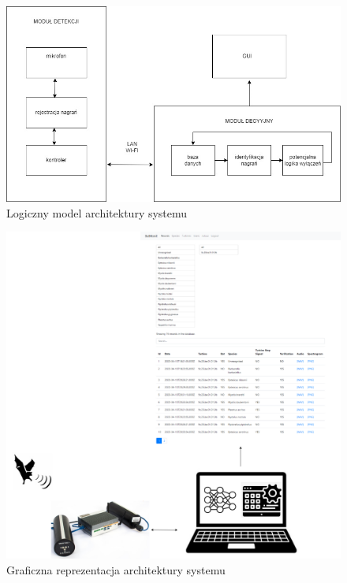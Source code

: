 \documentclass{sprz}
\begin{document}
\begin{figure}[h]
    \centering
    \includegraphics[width=1.0\textwidth]{sprz/architektura_systemu2.png}
    \caption{Logiczny model architektury systemu}
    \label{img:architektura_systemu2}
\end{figure}
\clearpage

\begin{figure}[h]
    \centering
    \includegraphics[width=1.0\textwidth]{sprz/graficzna-reprezentacja-systemu.png}
    \caption{Graficzna reprezentacja architektury systemu}
    \label{img:reprezentacja_graficzna}
\end{figure}
\end{document}
